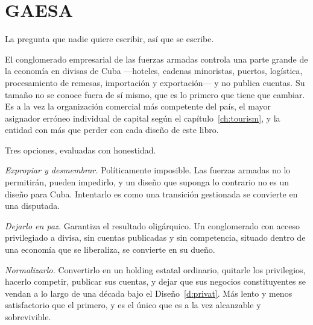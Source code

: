 \section{GAESA}

La pregunta que nadie quiere escribir, así que se escribe.

El conglomerado empresarial de las fuerzas armadas controla una parte grande de la economía en
divisas de Cuba ---hoteles, cadenas minoristas, puertos, logística, procesamiento de remesas,
importación y exportación--- y no publica cuentas. Su tamaño no se conoce fuera de sí mismo, que
es lo primero que tiene que cambiar. Es a la vez la organización comercial más competente del
país, el mayor asignador erróneo individual de capital según el capítulo~\ref{ch:tourism}, y la
entidad con más que perder con cada diseño de este libro.

Tres opciones, evaluadas con honestidad.

\emph{Expropiar y desmembrar.} Políticamente imposible. Las fuerzas armadas no lo permitirán,
pueden impedirlo, y un diseño que suponga lo contrario no es un diseño para Cuba. Intentarlo es
como una transición gestionada se convierte en una disputada.

\emph{Dejarlo en paz.} Garantiza el resultado oligárquico. Un conglomerado con acceso
privilegiado a divisa, sin cuentas publicadas y sin competencia, situado dentro de una economía
que se liberaliza, se convierte en su dueño.

\emph{Normalizarlo.} Convertirlo en un holding estatal ordinario, quitarle los privilegios,
hacerlo competir, publicar sus cuentas, y dejar que sus negocios constituyentes se vendan a lo
largo de una década bajo el Diseño~\ref{d:privat}. Más lento y menos satisfactorio que el
primero, y es el único que es a la vez alcanzable y sobrevivible.

